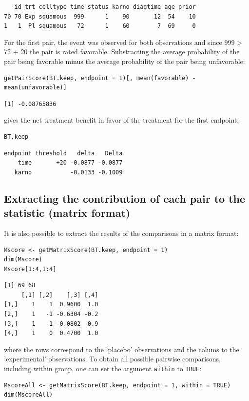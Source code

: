 \documentclass[12pt]{article}
\begin{document}
\begin{verbatim}
   id trt celltype time status karno diagtime age prior
70 70 Exp squamous  999      1    90       12  54    10
1   1  Pl squamous   72      1    60        7  69     0
\end{verbatim}



For the first pair, the event was observed for both observations and
since 999 > 72 + 20 the pair is rated favorable. Substracting the
average probability of the pair being favorable minus the average
probability of the pair being unfavorable:
\lstset{language=r,label= ,caption= ,captionpos=b,numbers=none}
\begin{lstlisting}
getPairScore(BT.keep, endpoint = 1)[, mean(favorable) - mean(unfavorable)]
\end{lstlisting}

\begin{verbatim}
[1] -0.08765836
\end{verbatim}


gives the net treatment benefit in favor of the treatment for the first
endpoint:
\lstset{language=r,label= ,caption= ,captionpos=b,numbers=none}
\begin{lstlisting}
BT.keep
\end{lstlisting}

\begin{verbatim}
endpoint threshold   delta   Delta
    time       +20 -0.0877 -0.0877
   karno           -0.0133 -0.1009
\end{verbatim}

\subsection{Extracting the contribution of each pair to the statistic (matrix format)}
\label{sec:org2ef9f13}
It is also possible to extract the results of the comparisons in a matrix format:
\lstset{language=r,label= ,caption= ,captionpos=b,numbers=none}
\begin{lstlisting}
Mscore <- getMatrixScore(BT.keep, endpoint = 1)
dim(Mscore)
Mscore[1:4,1:4]
\end{lstlisting}

\begin{verbatim}
[1] 69 68
     [,1] [,2]    [,3] [,4]
[1,]    1    1  0.9600  1.0
[2,]    1   -1 -0.6304 -0.2
[3,]    1   -1 -0.0802  0.9
[4,]    1    0  0.4700  1.0
\end{verbatim}


where the rows correspond to the 'placebo' observations and the colums
to the 'experimental' observations. To obtain all possible pairwise
comparisons, including within group, one can set the argument \texttt{within}
to \texttt{TRUE}:
\lstset{language=r,label= ,caption= ,captionpos=b,numbers=none}
\begin{lstlisting}
MscoreAll <- getMatrixScore(BT.keep, endpoint = 1, within = TRUE)
dim(MscoreAll)
\end{lstlisting}
\end{document}
